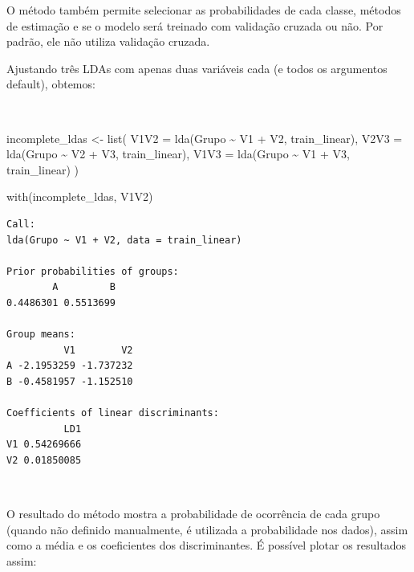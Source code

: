 \documentclass[
  a4paperpaper,
]{article}
\newenvironment{Shaded}{\begin{snugshade}}{\end{snugshade}}
\newcommand{\AttributeTok}[1]{\textcolor[rgb]{0.40,0.45,0.13}{#1}}
\newcommand{\FunctionTok}[1]{\textcolor[rgb]{0.28,0.35,0.67}{#1}}
\newcommand{\NormalTok}[1]{\textcolor[rgb]{0.00,0.23,0.31}{#1}}
\newcommand{\OtherTok}[1]{\textcolor[rgb]{0.00,0.23,0.31}{#1}}
\newcommand{\SpecialCharTok}[1]{\textcolor[rgb]{0.37,0.37,0.37}{#1}}
\begin{document}
O método também permite selecionar as probabilidades de cada classe,
métodos de estimação e se o modelo será treinado com validação cruzada
ou não. Por padrão, ele não utiliza validação cruzada.

Ajustando três LDAs com apenas duas variáveis cada (e todos os
argumentos default), obtemos:

~

\begin{Shaded}
\begin{Highlighting}[]
\NormalTok{incomplete\_ldas }\OtherTok{\textless{}{-}} \FunctionTok{list}\NormalTok{(}
  \AttributeTok{V1V2 =} \FunctionTok{lda}\NormalTok{(Grupo }\SpecialCharTok{\textasciitilde{}}\NormalTok{ V1 }\SpecialCharTok{+}\NormalTok{ V2, train\_linear),}
  \AttributeTok{V2V3 =} \FunctionTok{lda}\NormalTok{(Grupo }\SpecialCharTok{\textasciitilde{}}\NormalTok{ V2 }\SpecialCharTok{+}\NormalTok{ V3, train\_linear),}
  \AttributeTok{V1V3 =} \FunctionTok{lda}\NormalTok{(Grupo }\SpecialCharTok{\textasciitilde{}}\NormalTok{ V1 }\SpecialCharTok{+}\NormalTok{ V3, train\_linear)}
\NormalTok{)}

\FunctionTok{with}\NormalTok{(incomplete\_ldas, V1V2)}
\end{Highlighting}
\end{Shaded}

\begin{verbatim}
Call:
lda(Grupo ~ V1 + V2, data = train_linear)

Prior probabilities of groups:
        A         B 
0.4486301 0.5513699 

Group means:
          V1        V2
A -2.1953259 -1.737232
B -0.4581957 -1.152510

Coefficients of linear discriminants:
          LD1
V1 0.54269666
V2 0.01850085
\end{verbatim}

~

O resultado do método mostra a probabilidade de ocorrência de cada grupo
(quando não definido manualmente, é utilizada a probabilidade nos
dados), assim como a média e os coeficientes dos discriminantes. É
possível plotar os resultados assim:
\end{document}
